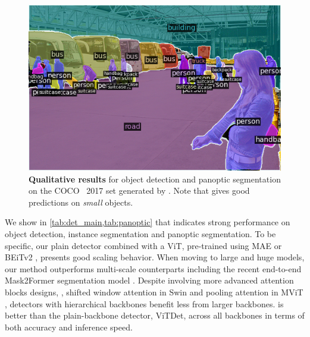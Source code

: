 \begin{figure}[!b]
\begin{minipage}{1\linewidth}
\begin{minipage}[b]{.24\linewidth}
\end{minipage}
\begin{minipage}[b]{.24\linewidth}
\includegraphics[width=\linewidth]{vis/success/val_965_pan.png}
\end{minipage}

\end{minipage}

\caption{\textbf{Qualitative results} for object detection and panoptic segmentation on the COCO~\cite{lin2014mscoco} 2017 \val set generated by \ours. Note that \ours gives good predictions on \emph{small} objects.}
\label{fig:vis}
\end{figure}

We show in \cref{tab:det_main,tab:panoptic} that \ours indicates strong performance on object detection, instance segmentation and panoptic segmentation. To be specific, our plain detector combined with a ViT, pre-trained using MAE \cite{he2022mae} or BEiTv2 \cite{peng2022beitv2}, presents good scaling behavior. When moving to large and huge models, our method outperforms multi-scale counterparts including the recent end-to-end Mask2Former segmentation model \cite{cheng2022mask2former}. Despite involving more advanced attention blocks designs, \ie, shifted window attention in Swin \cite{liu2021swintransformer} and pooling attention in MViT \cite{fan2021mvit}, detectors with hierarchical backbones benefit less from larger backbones. \ours is better than the plain-backbone detector, ViTDet, across all backbones in terms of both accuracy and inference speed.
    
